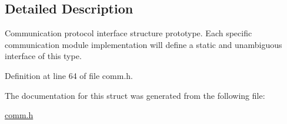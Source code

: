 \subsection{Detailed Description}
Communication protocol interface structure prototype. Each specific communication module implementation will define a static and unambiguous interface of this type. 

Definition at line 64 of file comm.\+h.



The documentation for this struct was generated from the following file\+:\begin{DoxyCompactItemize}
\item 
\hyperlink{comm_8h}{comm.\+h}\end{DoxyCompactItemize}
